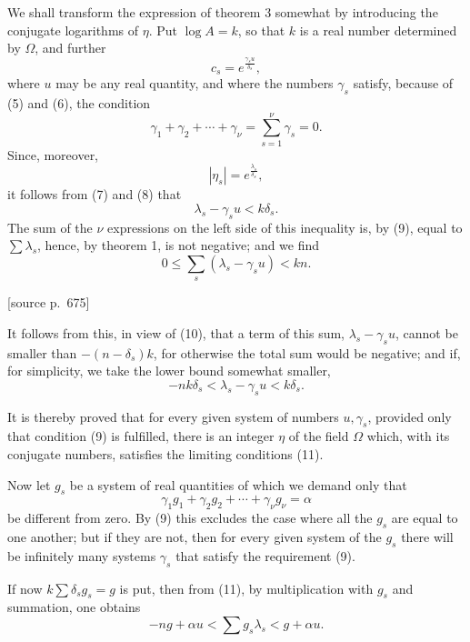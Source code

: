 \documentclass[11pt]{article}
\newcommand{\srcpage}[1]{\par\medskip\noindent\textsf{[source p.~#1]}\par\smallskip}
\begin{document}
We shall transform the expression of theorem 3 somewhat by introducing the conjugate logarithms of $\eta$. Put $\log A=k$, so that $k$ is a real number determined by $\Omega$, and further
\begin{equation}
c_s=e^{\frac{\gamma_su}{\delta_s}},
\tag{8}
\end{equation}
where $u$ may be any real quantity, and where the numbers $\gamma_s$ satisfy, because of (5) and (6), the condition
\begin{equation}
\gamma_1+\gamma_2+\cdots+\gamma_\nu=\sum_{s=1}^{\nu}\gamma_s=0.
\tag{9}
\end{equation}
Since, moreover,
\[
|\eta_s|=e^{\frac{\lambda_s}{\delta_s}},
\]
it follows from (7) and (8) that
\begin{equation}
\lambda_s-\gamma_su<k\delta_s.
\tag{10}
\end{equation}
The sum of the $\nu$ expressions on the left side of this inequality is, by (9), equal to $\sum\lambda_s$, hence, by theorem 1, is not negative; and we find
\[
0\leq \sum_s(\lambda_s-\gamma_su)<kn.
\]

\srcpage{675}
It follows from this, in view of (10), that a term of this sum, $\lambda_s-\gamma_su$, cannot be smaller than $-(n-\delta_s)k$, for otherwise the total sum would be negative; and if, for simplicity, we take the lower bound somewhat smaller,
\begin{equation}
-nk\delta_s<\lambda_s-\gamma_su<k\delta_s.
\tag{11}
\end{equation}

It is thereby proved that for every given system of numbers $u,\gamma_s$, provided only that condition (9) is fulfilled, there is an integer $\eta$ of the field $\Omega$ which, with its conjugate numbers, satisfies the limiting conditions (11).

Now let $g_s$ be a system of real quantities of which we demand only that
\[
\gamma_1g_1+\gamma_2g_2+\cdots+\gamma_\nu g_\nu=\alpha
\]
be different from zero. By (9) this excludes the case where all the $g_s$ are equal to one another; but if they are not, then for every given system of the $g_s$ there will be infinitely many systems $\gamma_s$ that satisfy the requirement (9).

If now $k\sum\delta_sg_s=g$ is put, then from (11), by multiplication with $g_s$ and summation, one obtains
\begin{equation}
-ng+\alpha u<\sum g_s\lambda_s<g+\alpha u.
\tag{12}
\end{equation}
\end{document}

